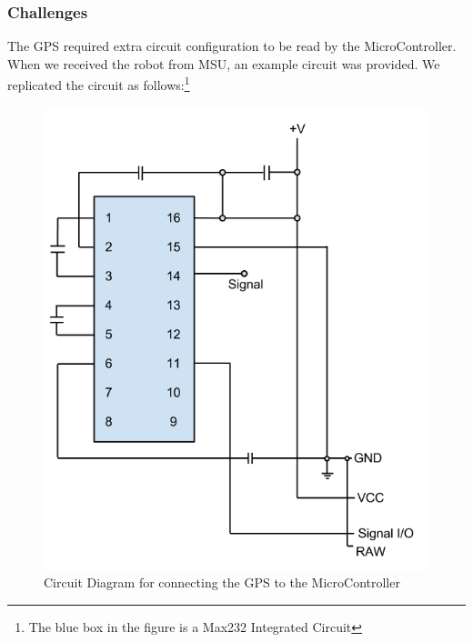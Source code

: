 \documentclass[12pt]{article}
\begin{document}
\subsubsection*{Challenges}
The GPS required extra circuit configuration to be read by the MicroController.  When we received the robot from MSU, an example circuit was provided.  We replicated the circuit as follows:\footnote{The blue box in the figure is a Max232 Integrated Circuit}
\begin{figure}[h]
\centerline{\includegraphics[scale=.6]{img/GPScurcuit}}
\caption{Circuit Diagram for connecting the GPS to the MicroController}
\end{figure}

\clearpage
\end{document}
